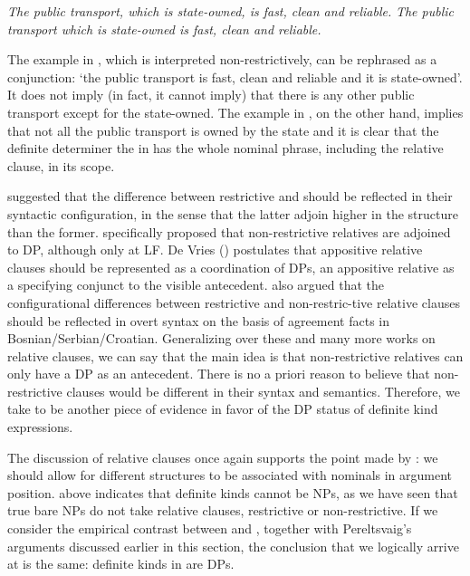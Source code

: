 \documentclass[output=paper
,modfonts
,nonflat]{langsci/langscibook}
\begin{document}
	\ea\label{ex:borik:25}
	\ea\label{ex:borik:25a} 
	\textit{
		{\ob}{\ob}The public transport{\cb}, {\ob}which is state-owned{\cb}{\cb}, is fast, clean and reliable.
	}
	\ex\label{ex:borik:25b}
	\textit{
		{\ob}The {\ob}public transport which is state-owned{\cb}{\cb} is fast, clean and reliable.
	}
	\z
	\z
	
	The example in , which is interpreted non-restrictively, can be rephrased as a conjunction: `the public transport is fast, clean and reliable and it is state-owned'. It does not imply (in fact, it cannot imply) that there is any other public transport except for the state-owned. The example in , on the other hand, implies that not all the public transport is owned by the state and it is clear that the definite determiner the in  has the whole nominal phrase, including the relative clause, in its scope. 
	
	\citet{Jackendoff1977} suggested that the difference between restrictive and  should be reflected in their syntactic configuration, in the sense that the latter adjoin higher in the structure than the former. \citet{Demirdache1991} specifically proposed that non-restrictive relatives are adjoined to DP, although only at LF. De Vries (\citeyear{deVries2006}) postulates that appositive relative clauses should be represented as a coordination of DPs, an appositive relative as a specifying conjunct to the visible antecedent. \citet{Arsenijevic2016} also argued that the configurational differences between restrictive and non-restric\hyp{}tive relative clauses should be reflected in overt syntax on the basis of agreement facts in Bosnian/Serbian/Croatian. Generalizing over these and many more works on relative clauses, we can say that the main idea is that non-restrictive relatives can only have a DP as an antecedent. There is no a priori reason to believe that  non-restrictive clauses would be different in their syntax and semantics. Therefore, we take  to be another piece of evidence in favor of the DP status of definite kind expressions. 
	
	The discussion of relative clauses once again supports the point made by \citet{Pereltsvaig2006}: we should allow for different structures to be associated with nominals in argument position.  above indicates that definite kinds cannot be NPs, as we have seen that true bare NPs do not take relative clauses, restrictive or non-restrictive. If we consider the empirical contrast between  and , together with Pereltsvaig's arguments discussed earlier in this section, the conclusion that we logically arrive at is the same: definite kinds in  are DPs.
	
\end{document}
